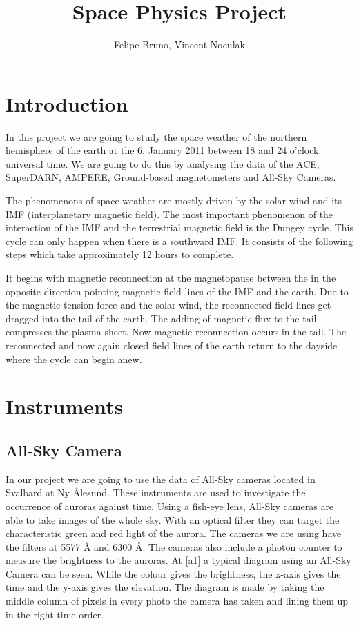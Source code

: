 \documentclass[10pt,a4paper]{article}
\author{Felipe Bruno, Vincent Noculak}
\title{Space Physics Project}
\begin{document}
\maketitle
\newpage
\tableofcontents
\newpage


\section{Introduction}

In this project we are going to study the space weather of the northern hemisphere of the earth at the 6. January 2011 between 18 and 24 o'clock universal time. We are going to do this by analysing the data of the ACE, SuperDARN, AMPERE, Ground-based magnetometers and All-Sky Cameras.

The phenomenons of space weather are mostly driven by the solar wind and its IMF (interplanetary magnetic field). The most important phenomenon of the interaction of the IMF and the terrestrial magnetic field is the Dungey cycle. This cycle can only happen when there is a southward IMF. It consists of the following steps which take approximately 12 hours to complete.

It begins with magnetic reconnection at the magnetopause between the in the opposite direction pointing magnetic field lines of the IMF and the earth. Due to the magnetic tension force and the solar wind, the reconnected field lines get dragged into the tail of the earth. The adding of magnetic flux to the tail compresses the plasma sheet. Now magnetic reconnection occurs in the tail. The reconnected and now again closed field lines of the earth return to the dayside where the cycle can begin anew.






\section{Instruments}

\subsection{All-Sky Camera}

In our project we are going to use the data of All-Sky cameras located in Svalbard at Ny Ålesund. These instruments are used to investigate the occurrence of auroras against time.
 Using a fish-eye lens, All-Sky cameras are able to take images of the whole sky. With an optical filter they can target the characteristic green and red light of the aurora. The cameras we are using have the filters at 5577 Å and 6300 Å. The cameras also include a photon counter to measure the brightness to the auroras. At \ref{a1} a typical diagram using an All-Sky Camera can be seen. While the colour gives the brightness, the x-axis gives the time and the y-axis gives the elevation. The diagram is made by taking the middle column of pixels in every photo the camera has taken and lining them up in the right time order.
\end{document}
